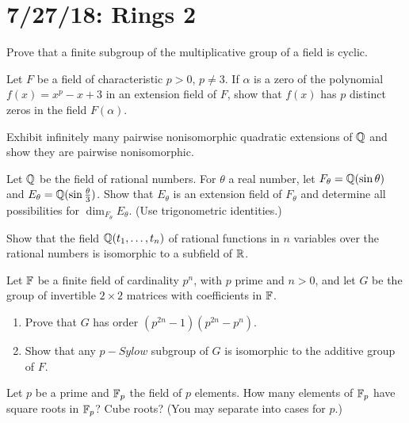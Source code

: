 \section{7/27/18: Rings 2}
\begin{problem}
	Prove that a finite subgroup of the multiplicative group of a field is cyclic.
\end{problem}

\begin{problem}
	Let $F$ be a field of characteristic $p>0$, $p\neq 3$. If $\alpha$ is a zero of the polynomial $f(x) = x^p - x + 3$ in an extension field of $F$, show that $f(x)$ has $p$ distinct zeros in the field $F(\alpha)$.
\end{problem}

\begin{problem}
	Exhibit infinitely many pairwise nonisomorphic quadratic extensions of $\mathbb{Q}$ and show they are pairwise nonisomorphic.
\end{problem}

\begin{problem}
	Let $\mathbb{Q}$ be the field of rational numbers. For $\theta$ a real number, let $F_\theta = \mathbb{Q}(\sin\theta)$ and $E_\theta = \mathbb{Q}(\sin\frac{\theta}{3})$. Show that $E_\theta$ is an extension field of $F_\theta$ and determine all possibilities for $\dim_{F_\theta} E_\theta$. (Use trigonometric identities.)
\end{problem}

\begin{problem}
	Show that the field $\mathbb{Q}(t_1,\ldots,t_n)$ of rational functions in $n$ variables over the rational numbers is isomorphic to a subfield of $\mathbb{R}$.
\end{problem}

\begin{problem}
	Let $\mathbb{F}$ be a finite field of cardinality $p^n$, with $p$ prime and $n>0$, and let $G$ be the group of invertible $2\times 2$ matrices with coefficients in $\mathbb{F}$.
	\begin{enumerate}
		\item Prove that $G$ has order $(p^{2n}-1)(p^{2n}-p^n)$.
		\item Show that any $p-Sylow$ subgroup of $G$ is isomorphic to the additive group of $F$.
	\end{enumerate}
\end{problem}

\begin{problem}
	Let $p$ be a prime and $\mathbb{F}_p$ the field of $p$ elements. How many elements of $\mathbb{F}_p$ have square roots in $\mathbb{F}_p$? Cube roots? (You may separate into cases for $p$.)
\end{problem}

